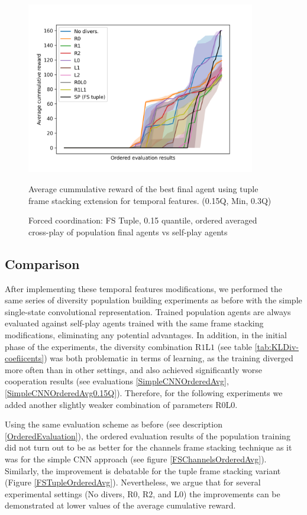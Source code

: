 \begin{figure}[!ht]
    \centering
    \includegraphics*[width=10cm]{../img/FSTupleOrderedQ15.png}

    \caption{Forced coordination: FS Tuple, 0.15 quantile, ordered averaged cross-play of population final agents vs self-play agents}
    \label{FSTupleOrderedQ15}
    \medskip
    \small 
    Average cummulative reward of the best final agent using tuple frame stacking extension for temporal features.    
    (0.15Q, Min, 0.3Q)

\end{figure}

\subsection{Comparison}
After implementing these temporal features modifications, we performed the same series of diversity population building experiments as before with the simple single-state convolutional representation.
Trained population agents are always evaluated against self-play agents trained with the same frame stacking modifications, eliminating any potential advantages.
In addition, in the initial phase of the experiments, the diversity combination R$1$L$1$ (see table \ref{tab:KLDiv-coefiicents}) was both problematic in terms of learning, as the training diverged more often than in other settings, and also achieved significantly worse cooperation results (see evaluations \ref{SimpleCNNOrderedAvg}, \ref{SimpleCNNOrderedAvg0.15Q}).
Therefore, for the following experiments we added another slightly weaker combination of parameters R$0$L$0$.

Using the same evaluation scheme as before (see description \ref{OrderedEvaluation}), the ordered evaluation results of the population training did not turn out to be as better for the channels frame stacking technique as it was for the simple CNN approach (see figure \ref{FSChannelsOrderedAvg}).
Similarly, the improvement is debatable for the tuple frame stacking variant (Figure \ref{FSTupleOrderedAvg}).
Nevertheless, we argue that for several experimental settings (No divers, R$0$, R$2$, and L$0$) the improvements can be demonstrated at lower values of the average cumulative reward.

